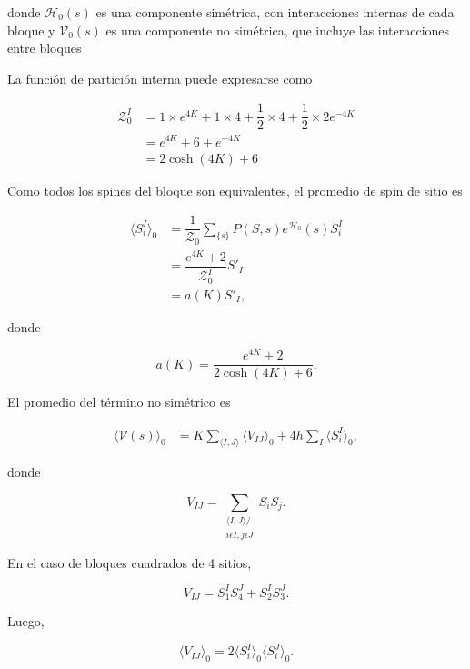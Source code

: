 \documentclass[10pt]{article}
\begin{document}
donde $\mathcal{H}_0(s)$ es una componente sim\'etrica, con interacciones internas de cada bloque y $ \mathcal{V}_0(s)$  es una componente no sim\'etrica, que incluye las interacciones entre bloques

La funci\'on de partici\'on interna puede expresarse como

\begin{align}
\mathcal{Z}_0^I &= 1\times e^{4K} + 1\times 4 + \dfrac{1}{2}\times 4 + \dfrac{1}{2}\times 2e^{-4K} \nonumber \\
&= e^{4K} + 6 + e^{-4K} \nonumber \\
&= 2 \cosh(4K) + 6
\end{align}

Como todos los spines del bloque son equivalentes, el promedio de spin de sitio es 

\begin{align}
\langle S_i^I \rangle_0 &= \dfrac{1}{\mathcal{Z}_0} \sum_{\lbrace s \rbrace} P(S, s) e^{\mathcal{H}_0}(s) S_i^I \nonumber \\
 &= \dfrac{e^{4K} + 2}{\mathcal{Z}_0^I} S'_I\nonumber \\
&= a(K) S'_I,
\end{align}

donde

\begin{equation}
a(K) =   \dfrac{e^{4K} + 2}{2 \cosh(4K) + 6}.
\end{equation}

El promedio del t\'ermino no sim\'etrico es

\begin{align}
\langle \mathcal{V}(s)\rangle_0 &= K\sum_{\langle I,J\rangle} \langle V_{IJ} \rangle_0 + 4 h \sum_I \langle S_i^I \rangle_0,
\end{align}

donde 

\begin{equation}
V_{IJ} = \sum_{\substack{\langle I,J\rangle/\\ i\epsilon I,j\epsilon J}} S_i S_j.
\end{equation}

En el caso de bloques cuadrados de 4 sitios,

\begin{equation}
V_{IJ} = S_1^I S_4^J+  S_2^I S_3^J.
\end{equation}

Luego,

\begin{equation}
\langle V_{IJ}\rangle_0 = 2\langle S_i^I \rangle_0 \langle S_i^J \rangle_0.
\end{equation}
\end{document}
